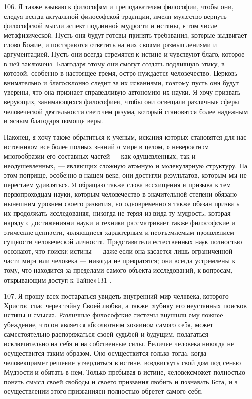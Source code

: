 \documentclass[a5paper,10pt]{article}
\begin{document}
106. Я также взываю к философам и преподавателям философии, чтобы они, следуя
всегда актуальной философской традиции, имели мужество вернуть философской
мысли аспект подлинной мудрости и истины, в том числе метафизической. Пусть они
будут готовы принять требования, которые выдвигает слово Божие, и постараются
ответить на них своими размышлениями и аргументацией. Пусть они всегда
стремятся к истине и чувствуют благо, которое в ней заключено. Благодаря этому
они смогут создать подлинную этику, в которой, особенно в настоящее время,
остро нуждается человечество. Церковь внимательно и благосклонно следит за их
исканиями; поэтому пусть они будут уверены, что она признает справедливую
автономию их науки. Я хочу призвать верующих, занимающихся философией, чтобы
они освещали различные сферы человеческой деятельности светочем разума, который
становится более надежным и ясным благодаря помощи веры.

Наконец, я хочу также обратиться к ученым, искания которых становятся для нас
источником все более полных знаний о мире в целом, о невероятном многообразии
его составных частей — как одушевленных, так и неодушевленных, — являющих
сложную атомную и молекулярную структуру. На этом поприще, особенно в нашем
веке, они достигли результатов, которым мы не перестаем удивляться. Я обращаю
также слова восхищения и призыва к тем первопроходцам науки, которым
человечество в значительной степени обязано нынешним уровнем своего развития,
но одновременно я также обязан призвать их продолжать исследования, никогда не
теряя из вида ту мудрость, которая наряду с достижениями науки и техники
рассматривает также философские и этические ценности, являющиеся характерным и
неотъемлемым проявлением сущности человеческой личности. Представители
естественных наук полностью осознают, что поиски истины — даже если она
касается лишь ограниченной части мира или человека — никогда не прекратятся;
они всегда устремлены к тому, что находится за пределами самого объекта
исследований, к вопросам, открывающим доступ к Тайне»131 .

107. Я прошу всех постараться увидеть внутренний мир человека, которого Христос
спас через тайну Своей любви, а также глубину его неустанных поисков истины и
смысла. Различные философские системы внушили ему ложное убеждение, что он
является абсолютным хозяином самого себя, может самостоятельно распоряжаться
своей судьбой и будущим, полагаться исключительно на себя и на собственные
силы. Величие человека никогда не осуществится таким образом. Оно осуществится
только тогда, когда человекпримет решение утвердиться в истине, воздвигнуть
свой дом под сенью Мудрости и обитать в нем. Только пребывая в истине,
человексможет полностью понять смысл своей свободы и своего призвания любить и
познавать Бога, и в осуществлении этого призванияон полностью обретет самого
себя.
\end{document}
